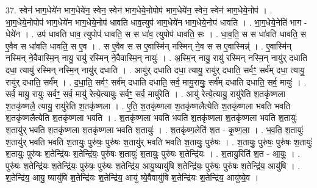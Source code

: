 \documentclass[17pt]{extarticle}
\begin{document}
37. स्वेन॑ भाग॒धेये॑न भाग॒धेये॑न॒ स्वेन॒ स्वेन॑ भाग॒धेये॒नोपोप॑ भाग॒धेये॑न॒ स्वेन॒ स्वेन॑ भाग॒धेये॒नोप॑ । . भा॒ग॒धेये॒नोपोप॑ भाग॒धेये॑न भाग॒धेये॒नोप॑ धावति धाव॒त्युप॑ भाग॒धेये॑न भाग॒धेये॒नोप॑ धावति । . भा॒ग॒धेये॒नेति॑ भाग - धेये॑न । . उप॑ धावति धाव॒ त्युपोप॑ धावति॒ स स धा॑व॒ त्युपोप॑ धावति॒ सः । . धा॒व॒ति॒ स स धा॑वति धावति॒ स ए॒वैव स धा॑वति धावति॒ स ए॒व । . स ए॒वैव स स ए॒वास्मि॑न् नस्मिन् ने॒व स स ए॒वास्मिन्न्॑ । . ए॒वास्मि॑न् नस्मिन् ने॒वैवास्मि॒न् नायु॒ रायु॑ रस्मिन् ने॒वैवास्मि॒न् नायुः॑ । . अ॒स्मि॒न् नायु॒ रायु॑ रस्मिन् नस्मि॒न् नायु॑र् दधाति दधा॒ त्यायु॑ रस्मिन् नस्मि॒न् नायु॑र् दधाति । . आयु॑र् दधाति दधा॒ त्यायु॒ रायु॑र् दधाति॒ सर्वꣳ॒॒ सर्व॑म् दधा॒ त्यायु॒ रायु॑र् दधाति॒ सर्व᳚म् । . द॒धा॒ति॒ सर्वꣳ॒॒ सर्व॑म् दधाति दधाति॒ सर्व॒ मायु॒रायुः॒ सर्व॑म् दधाति दधाति॒ सर्व॒ मायुः॑ । . सर्व॒ मायु॒ रायुः॒ सर्वꣳ॒॒ सर्व॒ मायु॑ रेत्ये॒त्यायुः॒ सर्वꣳ॒॒ सर्व॒ मायु॑रेति । . आयु॑ रेत्ये॒त्यायु॒ रायु॑रेति श॒तकृ॑ष्णला श॒तकृ॑ष्णलै॒ त्यायु॒ रायु॑रेति श॒तकृ॑ष्णला । . ए॒ति॒ श॒तकृ॑ष्णला श॒तकृ॑ष्णलैत्येति श॒तकृ॑ष्णला भवति भवति श॒तकृ॑ष्णलैत्येति श॒तकृ॑ष्णला भवति । . श॒तकृ॑ष्णला भवति भवति श॒तकृ॑ष्णला श॒तकृ॑ष्णला भवति श॒तायुः॑ श॒तायु॑र् भवति श॒तकृ॑ष्णला श॒तकृ॑ष्णला भवति श॒तायुः॑ । . श॒तकृ॑ष्ण॒लेति॑ श॒त - कृ॒ष्ण॒ला॒ । . भ॒व॒ति॒ श॒तायुः॑ श॒तायु॑र् भवति भवति श॒तायुः॒ पुरु॑षः॒ पुरु॑षः श॒तायु॑र् भवति भवति श॒तायुः॒ पुरु॑षः । . श॒तायुः॒ पुरु॑षः॒ पुरु॑षः श॒तायुः॑ श॒तायुः॒ पुरु॑षः श॒तेन्द्रि॑यः श॒तेन्द्रि॑यः॒ पुरु॑षः श॒तायुः॑ श॒तायुः॒ पुरु॑षः श॒तेन्द्रि॑यः । . श॒तायु॒रिति॑ श॒त - आ॒युः॒ । . पुरु॑षः श॒तेन्द्रि॑यः श॒तेन्द्रि॑यः॒ पुरु॑षः॒ पुरु॑षः श॒तेन्द्रि॑य॒ आयु॒ष्यायु॑षि श॒तेन्द्रि॑यः॒ पुरु॑षः॒ पुरु॑षः श॒तेन्द्रि॑य॒ आयु॑षि । . श॒तेन्द्रि॑य॒ आयु॒ ष्यायु॑षि श॒तेन्द्रि॑यः श॒तेन्द्रि॑य॒ आयु॑ ष्ये॒वैवायु॑षि श॒तेन्द्रि॑यः श॒तेन्द्रि॑य॒ आयु॑ष्ये॒व । \newline
\end{document}
